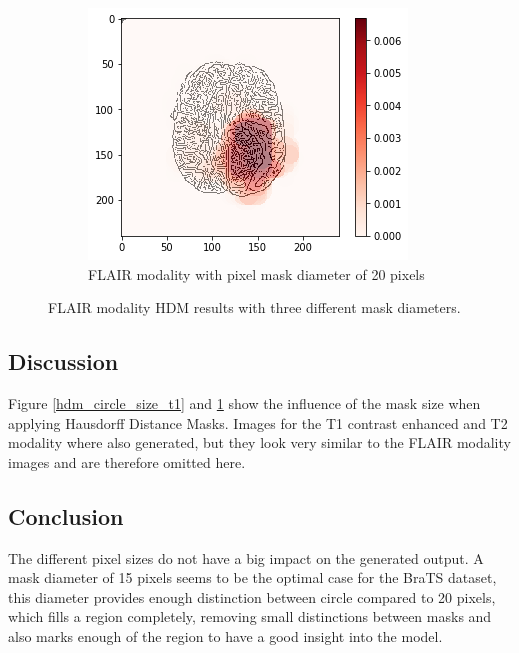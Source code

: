 \begin{figure}[H]
    \begin{subfigure}{.32\textwidth}
    \centering
        \includegraphics[width=\linewidth]{chapters/06_hdm/circle20/18.png}
        \caption{FLAIR modality with pixel mask diameter of 20 pixels}
    \end{subfigure}
    \caption{FLAIR modality HDM results with three different mask diameters.}
    \label{hdm_circle_size_flair}
\end{figure}

\subsection{Discussion}
Figure \ref{hdm_circle_size_t1} and \ref{hdm_circle_size_flair} show the influence of the mask size when applying Hausdorff Distance Masks.
Images for the T1 contrast enhanced and T2 modality where also generated, but they look very similar to the FLAIR modality images and are therefore omitted here.

\subsection{Conclusion}
The different pixel sizes do not have a big impact on the generated output. A mask diameter of 15 pixels seems to be the optimal case for the BraTS dataset, this diameter
provides enough distinction between circle compared to 20 pixels, which fills a region completely, removing small distinctions between masks and also marks enough of the region to have a good insight into the model.
